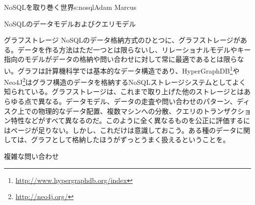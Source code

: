 \begin{aosachapter}{NoSQLを取り巻く世界}{s:nosql}{Adam Marcus}
\begin{aosasect1}{NoSQLのデータモデルおよびクエリモデル}
\begin{aosasect2}{グラフストレージ}
NoSQLのデータ格納方式のひとつに、グラフストレージがある。データを作る方法はただ一つとは限らないし、リレーショナルモデルやキー指向のモデルがデータの格納や問い合わせに対して常に最適であるとは限らない。グラフは計算機科学では基本的なデータ構造であり、HyperGraphDB\footnote{\url{http://www.hypergraphdb.org/index}}やNeo4J\footnote{\url{http://neo4j.org/}}はグラフ構造のデータを格納するNoSQLストレージシステムとしてよく知られている。グラフストレージは、これまで取り上げた他のストレージとはあらゆる点で異なる。データモデル、データの走査や問い合わせのパターン、ディスク上での物理的なデータ配置、複数マシンへの分散、クエリのトランザクション特性などがすべて異なるのだ。このように全く異なるものを公正に評価するにはページが足りない。しかし、これだけは意識しておこう。ある種のデータに関しては、グラフとして格納したほうがずっとうまく扱えるということを。

\end{aosasect2}

\begin{aosasect2}{複雑な問い合わせ}


\end{aosasect2}
\end{aosasect1}
\end{aosachapter}
